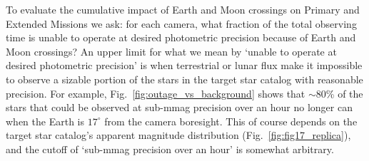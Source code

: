 To evaluate the cumulative impact of Earth and Moon crossings on \tesss 
Primary and Extended Missions we ask: for each camera, what fraction of the 
total observing time is \tess unable to operate at desired photometric 
precision because of Earth and Moon crossings?
An upper limit for what we mean by `unable to operate at desired photometric 
precision' is when terrestrial or lunar flux make it impossible to observe a sizable portion of the stars in the \tess target star catalog with reasonable precision.
For example, Fig.~\ref{fig:outage_vs_background} shows that $\sim$80\% of the stars that could be observed at sub-mmag precision over an hour no longer can when the Earth is $17^\circ$ from the camera boresight.
This of course depends on the target star catalog's apparent magnitude distribution (Fig.~\ref{fig:fig17_replica}), and the cutoff of `sub-mmag precision over an hour' is somewhat arbitrary.

